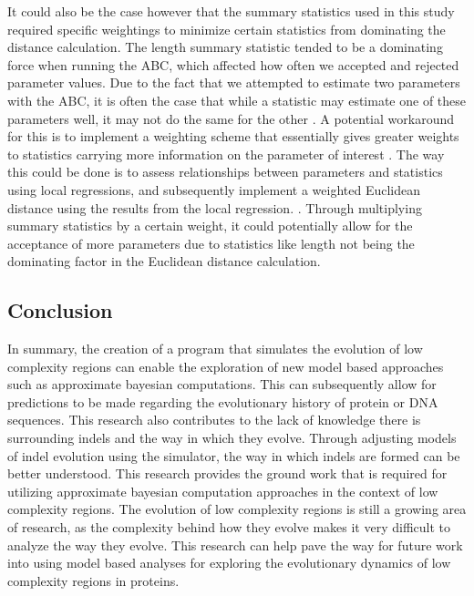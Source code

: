 \documentclass[10pt]{article}
\begin{document}
It could also be the case however that the summary statistics used in this study required specific weightings to minimize certain statistics from dominating the distance calculation. The length summary statistic tended to be a dominating force when running the ABC, which affected how often we accepted and rejected parameter values. Due to the fact that we attempted to estimate two parameters with the ABC, it is often the case that while a statistic may estimate one of these parameters well, it may not do the same for the other \citep{hamilton2005bayesian}. A potential workaround for this is to implement a weighting scheme that essentially gives greater weights to statistics carrying more information on the parameter of interest \citep{hamilton2005bayesian}. The way this could be done is to assess relationships between parameters and statistics using local regressions, and subsequently implement a weighted Euclidean distance using the results from the local regression. \citep{hamilton2005bayesian}. Through multiplying summary statistics by a certain weight, it could potentially allow for the acceptance of more parameters due to statistics like length not being the dominating factor in the Euclidean distance calculation.

\subsection{Conclusion}

In summary, the creation of a program that simulates the evolution of low complexity regions can enable the exploration of new model based approaches such as approximate bayesian computations. This can subsequently allow for predictions to be made regarding the evolutionary history of protein or DNA sequences. This research also contributes to the lack of knowledge there is surrounding indels and the way in which they evolve. Through adjusting models of indel evolution using the simulator, the way in which indels are formed can be better understood. This research provides the ground work that is required for utilizing approximate bayesian computation approaches in the context of low complexity regions. The evolution of low complexity regions is still a growing area of research, as the complexity behind how they evolve makes it very difficult to analyze the way they evolve. This research can help pave the way for future work into using model based analyses for exploring the evolutionary dynamics of low complexity regions in proteins.

\clearpage\newpage
\end{document}
